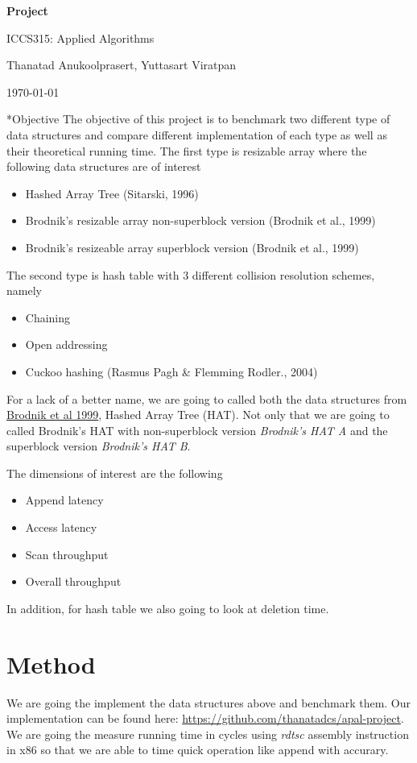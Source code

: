 \documentclass{article} %
\newcommand{\question}[2][]{\begin{flushleft}
                                \textbf{Question #1}: \textit{#2}

\end{flushleft}}
\newcommand{\maketitletwo}[2][]{\begin{center}
                                    \Large{\textbf{Project #1}

                                    ICCS315: Applied Algorithms} %
                                    \vspace{5pt}

                                    \normalsize{Thanatad Anukoolprasert, Yuttasart Viratpan   %

                                    \today}        %
                                    \vspace{15pt}
\end{center}}
\begin{document}
    \maketitletwo[]  %

    \section*{Objective}
    The objective of this project is to benchmark two different type of data structures and compare different
    implementation of each type as well as their theoretical running time.
    The first type is resizable array where the following data structures are of interest
    \begin{itemize}
        \item Hashed Array Tree (Sitarski, 1996)
        \item Brodnik's resizable array non-superblock version (Brodnik et al., 1999)
        \item Brodnik's resizeable array superblock version (Brodnik et al., 1999)
    \end{itemize}

    The second type is hash table with 3 different collision resolution schemes, namely
    \begin{itemize}
        \item Chaining
        \item Open addressing
        \item Cuckoo hashing (Rasmus Pagh \& Flemming Rodler., 2004)
    \end{itemize}

    For a lack of a better name, we are going to called both the data structures from \href{ https://sedgewick.io/wp-content/themes/sedgewick/papers/1999Optimal.pdf}{ Brodnik et al 1999}, Hashed Array Tree (HAT).
    Not only that we are going to called Brodnik's HAT with non-superblock version \emph{Brodnik's HAT A} and the superblock version \emph{Brodnik's HAT B}.

    The dimensions of interest are the following
    \begin{itemize}
        \item Append latency
        \item Access latency
        \item Scan throughput
        \item Overall throughput
    \end{itemize}
    In addition, for hash table we also going to look at deletion time.

    \section*{Method}
    We are going the implement the data structures above and benchmark them. Our implementation can be found here: \href{https://github.com/thanatadcs/apal-project}{ https://github.com/thanatadcs/apal-project}.
    We are going the measure running time in cycles using
    \emph{rdtsc} assembly instruction in x86 so that we are able to time quick operation like append with accurary.
\end{document}
